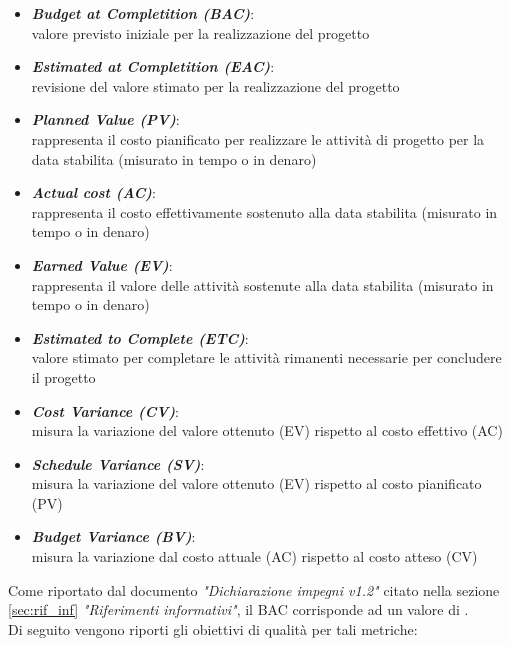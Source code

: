 \begin{itemize}
    \item \textbf{\emph{Budget at Completition (BAC)}}:\\
    valore previsto iniziale per la realizzazione del progetto
    \item \textbf{\emph{Estimated at Completition (EAC)}}:\\
    revisione del valore stimato per la realizzazione del progetto
    \item \textbf{\emph{Planned Value (PV)}}:\\
    rappresenta il costo pianificato per realizzare le attività di progetto per la data stabilita (misurato in tempo o in denaro)
    \item \textbf{\emph{Actual cost (AC)}}:\\
    rappresenta il costo effettivamente sostenuto alla data stabilita (misurato in tempo o in denaro)
    \item \textbf{\emph{Earned Value (EV)}}:\\
    rappresenta il valore delle attività sostenute alla data stabilita (misurato in tempo o in denaro)
    \item \textbf{\emph{Estimated to Complete (ETC)}}:\\
    valore stimato per completare le attività rimanenti necessarie per concludere il progetto
    \item \textbf{\emph{Cost Variance (CV)}}:\\
    misura la variazione del valore ottenuto (EV) rispetto al costo effettivo (AC)
    \item \textbf{\emph{Schedule Variance (SV)}}:\\
    misura la variazione del valore ottenuto (EV) rispetto al costo pianificato (PV)
    \item \textbf{\emph{Budget Variance (BV)}}:\\
    misura la variazione dal costo attuale (AC) rispetto al costo atteso (CV)
    \end{itemize}

Come riportato dal documento \emph{"Dichiarazione impegni v1.2"} citato nella sezione \ref{sec:rif_inf} \emph{"Riferimenti informativi"}, il BAC corrisponde ad un valore di .\\
Di seguito vengono riporti gli obiettivi di qualità per tali metriche:

